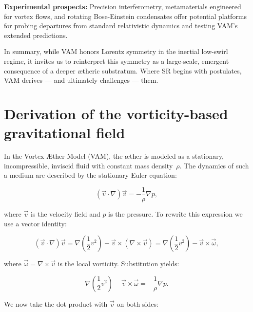 \documentclass[preprint]{revtex4-2}
\begin{document}
    \textbf{Experimental prospects:} Precision interferometry, metamaterials engineered for vortex flows, and rotating Bose-Einstein condensates offer potential platforms for probing departures from standard relativistic dynamics and testing VAM’s extended predictions.

    In summary, while VAM honors Lorentz symmetry in the inertial low-swirl regime, it invites us to reinterpret this symmetry as a large-scale, emergent consequence of a deeper ætheric substratum. Where SR begins with postulates, VAM derives — and ultimately challenges — them.



%    
%    
\section{Derivation of the vorticity-based gravitational field}\label{sec:appendix:2}

In the Vortex Æther Model (VAM), the æther is modeled as a stationary, incompressible, inviscid fluid with constant mass density~$\rho$. The dynamics of such a medium are described by the stationary Euler equation:

\begin{equation}
(\vec{v} \cdot \nabla)\vec{v} = -\frac{1}{\rho} \nabla p,
\end{equation}

where $\vec{v}$ is the velocity field and $p$ is the pressure. To rewrite this expression we use a vector identity:

\begin{equation}
(\vec{v} \cdot \nabla)\vec{v} = \nabla\left(\frac{1}{2}v^2\right) - \vec{v} \times (\nabla \times \vec{v}) = \nabla\left(\frac{1}{2}v^2\right) - \vec{v} \times \vec{\omega},
\end{equation}

where $\vec{\omega} = \nabla \times \vec{v}$ is the local vorticity. Substitution yields:

\begin{equation}
    \nabla\left(\frac{1}{2}v^2\right) - \vec{v} \times \vec{\omega} = -\frac{1}{\rho} \nabla p.
\end{equation}

We now take the dot product with $\vec{v}$ on both sides:
\end{document}
